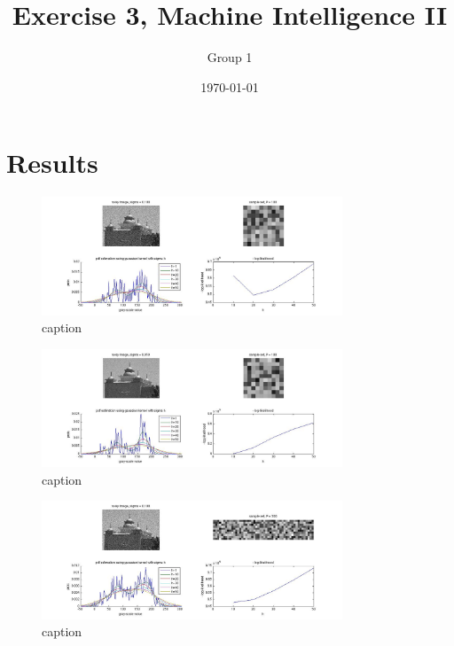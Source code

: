 \documentclass[]{article}
\title{Exercise 3, Machine Intelligence II}
\author{Group 1}
\date{\today}
\begin{document}
\ifpdf
{}
\else
{}
\fi

\maketitle

\section{Results}

\begin{figure}[h]
	\centering
		\includegraphics[width=0.8\textwidth]{plot100_01.jpg}
	\caption{caption}
	\label{sg:fig:plot100_01}
\end{figure}

\begin{figure}[h]
	\centering
		\includegraphics[width=0.8\textwidth]{plot100_005.jpg}
	\caption{caption}
	\label{sg:fig:plot100_005}
\end{figure}

\begin{figure}[h]
	\centering
		\includegraphics[width=0.8\textwidth]{plot500_01.jpg}
	\caption{caption}
	\label{sg:fig:plot500_01}
\end{figure}
\end{document}
